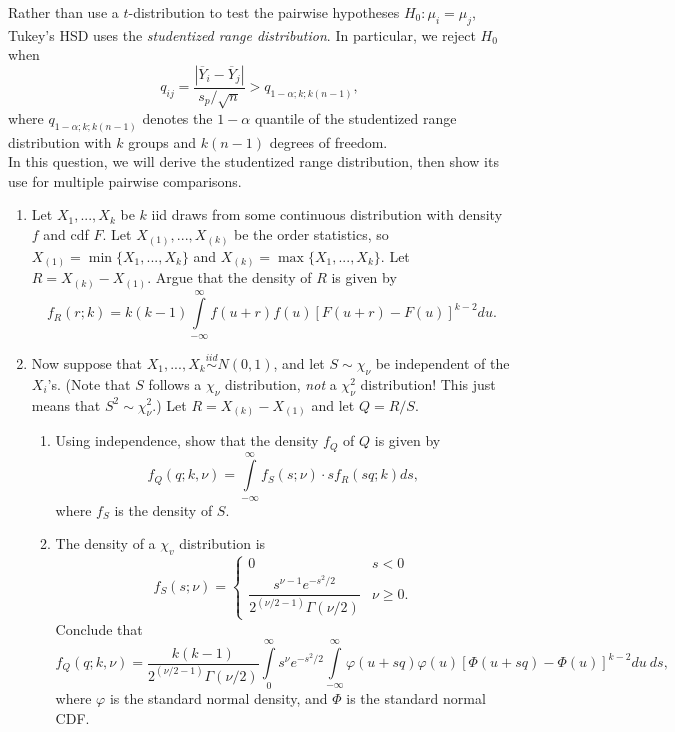 \documentclass[11pt]{article}
\begin{document}
\begin{enumerate}
Rather than use a $t$-distribution to test the pairwise hypotheses $H_0: \mu_i = \mu_j$, Tukey's HSD uses the \textit{studentized range distribution}. In particular, we reject $H_0$ when 
$$q_{ij} = \dfrac{|\overline{Y}_i - \overline{Y}_j|}{s_p /\sqrt{n}} > q_{1 - \alpha; k; k(n - 1)},$$
where $q_{1 - \alpha; k; k(n - 1)}$ denotes the $1 - \alpha$ quantile of the studentized range distribution with $k$ groups and $k(n-1)$ degrees of freedom.\\

In this question, we will derive the studentized range distribution, then show its use for multiple pairwise comparisons.

\begin{enumerate}
\item Let $X_1,...,X_k$ be $k$ iid draws from some continuous distribution with density $f$ and cdf $F$. Let $X_{(1)},...,X_{(k)}$ be the order statistics, so $X_{(1)} = \min \{X_1,...,X_k\}$ and $X_{(k)} = \max\{X_1,...,X_k\}$. Let $R = X_{(k)} - X_{(1)}$. Argue that the density of $R$ is given by
$$f_R(r; k) = k(k-1) \int \limits_{-\infty}^\infty f(u + r)f(u)[F(u + r) - F(u)]^{k-2} du.$$

\item Now suppose that $X_1,...,X_k \overset{iid}{\sim} N(0, 1)$, and let $S \sim \chi_\nu$ be independent of the $X_i$'s. (Note that $S$ follows a $\chi_\nu$ distribution, \textit{not} a $\chi^2_\nu$ distribution! This just means that $S^2 \sim \chi^2_\nu$.) Let $R = X_{(k)} - X_{(1)}$ and let $Q = R/S$.

\begin{enumerate}
\item Using independence, show that the density $f_Q$ of $Q$ is given by
$$f_Q(q; k, \nu) = \int \limits_{-\infty}^\infty f_S(s; \nu) \cdot s f_R(sq; k) ds,$$
where $f_S$ is the density of $S$.

\item The density of a $\chi_v$ distribution is 
$$f_S(s; \nu) = \begin{cases}
0 & s < 0 \\
\dfrac{s^{\nu - 1}e^{-s^2/2}}{2^{(\nu/2 -1)} \Gamma(\nu/2)} & \nu \geq 0. \end{cases}$$
Conclude that 
$$f_Q(q; k, \nu) = \dfrac{k(k-1)}{2^{(\nu/2 -1)} \Gamma(\nu/2)} \int \limits_0^\infty s^\nu e^{-s^2/2} \int \limits_{-\infty}^\infty \varphi(u + sq) \varphi(u) \left[ \Phi(u + sq) - \Phi(u) \right]^{k-2} du \ ds,$$
where $\varphi$ is the standard normal density, and $\Phi$ is the standard normal CDF.\\
\end{enumerate}


\end{enumerate}
\end{enumerate}
\end{document}
